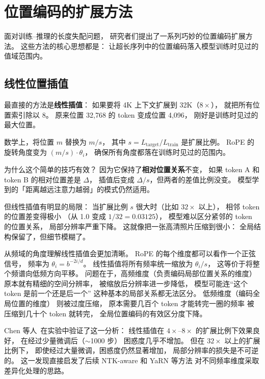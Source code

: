 \section{位置编码的扩展方法}

面对训练--推理的长度失配问题，
研究者们提出了一系列巧妙的位置编码扩展方法。
这些方法的核心思想都是：
让超长序列中的位置编码落入模型训练时见过的值域范围内。

\subsection{线性位置插值}

最直接的方法是\textbf{线性插值}：
如果要将 4K 上下文扩展到 32K（$8\times$），
就把所有位置索引除以 8。
原来位置 32,768 的 token 变成位置 4,096，
刚好是训练时见过的最大位置。


数学上，将位置 $m$ 替换为 $m/s$，
其中 $s = L_{\text{target}} / L_{\text{train}}$ 是扩展比例。
RoPE 的旋转角度变为 $(m/s) \cdot \theta_i$，
确保所有角度都落在训练时见过的范围内。

为什么这个简单的技巧有效？
因为它保持了\textbf{相对位置关系}不变，
如果 token A 和 token B 的相对位置差是 $\Delta$，
插值后变成 $\Delta / s$，但两者的差值比例没变。
模型学到的「距离越远注意力越弱」的模式仍然适用。

但线性插值有明显的局限：
当扩展比例 $s$ 很大时（比如 $32\times$ 以上），
相邻 token 的位置差变得极小
（从 1.0 变成 $1/32 = 0.03125$），
模型难以区分紧邻的 token 的位置关系，
局部分辨率严重下降。
这就像把一张高清照片压缩到很小：
全局结构保留了，但细节模糊了。

从频域的角度理解线性插值会更加清晰。
RoPE 的每个维度都可以看作一个正弦信号，
频率为 $\theta_i = b^{-2i/d}$。
线性插值将所有频率统一缩放为 $\theta_i / s$，
这等价于将整个频谱向低频方向平移。
问题在于，高频维度（负责编码局部位置关系的维度）
原本就有精细的空间分辨率，
被缩放后分辨率进一步降低，
模型可能连“这个 token 是前一个还是后一个”
这种基本的局部关系都无法区分。
低频维度（编码全局位置的维度）
则被过度压缩，
原本需要几百个 token 才能转完一圈的频率
被压缩到几十个 token 就转完，
全局位置编码的有效区分度下降。

Chen 等人~\cite{chen2023extending}在实验中验证了这一分析：
线性插值在 $4\times$--$8\times$ 的扩展比例下效果良好，
在经过少量微调后（$\sim$1000 步）
困惑度几乎不增加。
但在 $32\times$ 以上的扩展比例下，
即使经过大量微调，困惑度仍然显著增加，
局部分辨率的损失是不可逆的。
这一发现直接启发了后续 NTK-aware 和 YaRN 等方法
对不同频率维度采取差异化处理的思路。


